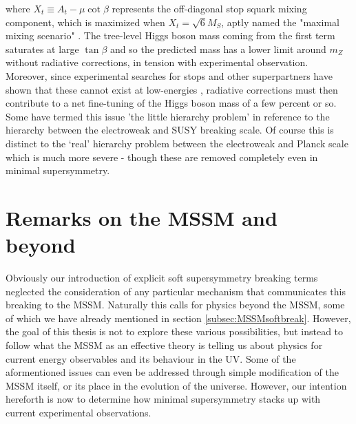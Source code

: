 where $X_{t}\equiv A_{t}-\mu\cot\beta$ represents the off-diagonal stop squark mixing component, which is maximized when $X_{t}=\sqrt{6}M_{S}$, aptly named the "maximal mixing scenario" \cite{RN230}. The tree-level Higgs boson mass coming from the first term saturates at large $\tan \beta$ and so the predicted mass has a lower limit around $m_Z$ without radiative corrections, in tension with experimental observation. Moreover, since experimental searches for stops and other superpartners have shown that these cannot exist at low-energies \cite{RN567,RN568,RN569,RN570}, radiative corrections must then contribute to a net fine-tuning of the Higgs boson mass of a few percent or so. Some have termed this issue 'the little hierarchy problem' in reference to the hierarchy between the electroweak and SUSY breaking scale. Of course this is distinct to the `real' hierarchy problem between the electroweak and Planck scale which is much more severe  - though these are removed completely even in minimal supersymmetry.

\section{Remarks on the MSSM and beyond}

Obviously our introduction of explicit soft supersymmetry breaking terms neglected the consideration of any particular mechanism that communicates this breaking to the MSSM. Naturally this calls for physics beyond the MSSM, some of which we have already mentioned in section \ref{subsec:MSSMsoftbreak}. However, the goal of this thesis is not to explore these various possibilities, but instead to follow what the MSSM as an effective theory is telling us about physics for current energy observables and its behaviour in the UV. Some of the aformentioned issues can even be addressed through simple modification of the MSSM itself, or its place in the evolution of the universe. However, our intention hereforth is now to determine how minimal supersymmetry stacks up with current experimental observations.

